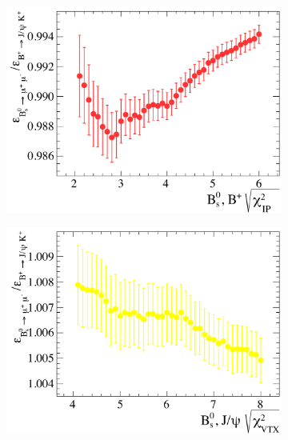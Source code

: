 \begin{figure}[p]
  \centering
  \begin{subfigure}[b]{0.48\textwidth}
    \includegraphics[width=\textwidth]{./Figs/Selection/B2JpsiK_IP.pdf}
    \caption{}
    \label{fig:JpsiIP}   
  \end{subfigure}             
  \begin{subfigure}[b]{0.48\textwidth}
    \includegraphics[width=\textwidth]{./Figs/Selection/B2JpsiK_VTX.pdf}
    \caption{}
    \label{fig:Jpsovertex}
  \end{subfigure}             
  \begin{subfigure}[b]{0.48\textwidth}

\end{subfigure}
\end{figure}

